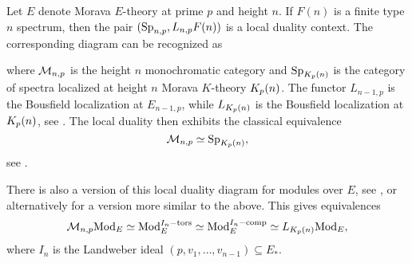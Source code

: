 \begin{example}
    \label{ch1:ex:local-duality-chromatic}
    Let $E$ denote Morava $E$-theory at prime $p$ and height $n$. If $F(n)$ is a finite type $n$ spectrum, then the pair $(\mathrm{Sp}_{n,p}, L_{n,p} F(n))$ is a local duality context. The corresponding diagram can be recognized as
    \begin{center}
    \end{center}
    where $\mathcal{M}_{n,p}$ is the height $n$ monochromatic category and $\mathrm{Sp}_{{K_p(n)}}$ is the category of spectra localized at height $n$ Morava $K$-theory ${K_p(n)}$. The functor $L_{n-1,p}$ is the Bousfield localization at $E_{n-1,p}$, while $L_{{K_p(n)}}$ is the Bousfield localization at ${K_p(n)}$, see \cite{bousfield_1979_localization}. The local duality then exhibits the classical equivalence 
    \[\mathcal{M}_{n,p}\simeq \mathrm{Sp}_{{K_p(n)}},\] 
    see \cite[6.19]{hovey-strickland_99}. 
\end{example}

\begin{remark}
    \label{ch1:rm:local-duality-modules}
    There is also a version of this local duality diagram for modules over $E$, see \cite[4.2, 5.1]{greenlees-may_1995}, or alternatively \cite[3.7]{barthel-heard-valenzuela_2018} for a version more similar to the above. This gives equivalences 
    \[\mathcal{M}_{n,p}\mathrm{Mod}_{E}\simeq \mathrm{Mod}_{E}^{I_n-\mathrm{tors}}\simeq \mathrm{Mod}_{E}^{I_n-\mathrm{comp}}\simeq L_{{K_p(n)}}\mathrm{Mod}_{E},\]
    where $I_n$ is the Landweber ideal $(p,v_1, \ldots, v_{n-1})\subseteq E_*$.
\end{remark}

